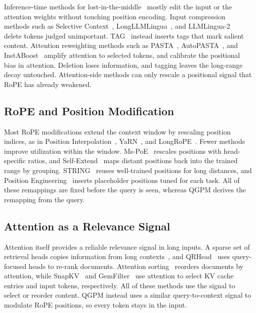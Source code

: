 \documentclass[11pt]{article}
\begin{document}
Inference-time methods for lost-in-the-middle~\citep{liu2024lost} mostly edit the input or the attention weights without touching position encoding. Input compression methods such as Selective Context~\citep{li2023compressing}, LongLLMLingua~\citep{jiang2024longllmlingua}, and LLMLingua-2~\citep{pan2024llmlingua2} delete tokens judged unimportant. TAG~\citep{pal2025tagging} instead inserts tags that mark salient content. Attention reweighting methods such as PASTA~\citep{zhang2024tell}, AutoPASTA~\citep{zhang2024model}, and InstABoost~\citep{guardieiro2025instruction} amplify attention to selected tokens, and \citet{hsieh2024found} calibrate the positional bias in attention. Deletion loses information, and tagging leaves the long-range decay untouched. Attention-side methods can only rescale a positional signal that RoPE has already weakened.

\subsection{RoPE and Position Modification}

Most RoPE modifications extend the context window by rescaling position indices, as in Position Interpolation~\citep{chen2023extending}, YaRN~\citep{peng2024yarn}, and LongRoPE~\citep{ding2024longrope}. Fewer methods improve utilization within the window. Ms-PoE~\citep{zhang2024found} rescales positions with head-specific ratios, and Self-Extend~\citep{jin2024llm} maps distant positions back into the trained range by grouping. STRING~\citep{an2025why} reuses well-trained positions for long distances, and Position Engineering~\citep{he2024position} inserts placeholder positions tuned for each task. All of these remappings are fixed before the query is seen, whereas QGPM derives the remapping from the query.

\subsection{Attention as a Relevance Signal}

Attention itself provides a reliable relevance signal in long inputs. A sparse set of retrieval heads copies information from long contexts~\citep{wu2025retrieval}, and QRHead~\citep{zhang2025query} uses query-focused heads to re-rank documents. Attention sorting~\citep{peysakhovich2023attention} reorders documents by attention, while SnapKV~\citep{li2024snapkv} and GemFilter~\citep{shi2026discovering} use attention to select KV cache entries and input tokens, respectively. All of these methods use the signal to select or reorder content. QGPM instead uses a similar query-to-context signal to modulate RoPE positions, so every token stays in the input.
\end{document}
